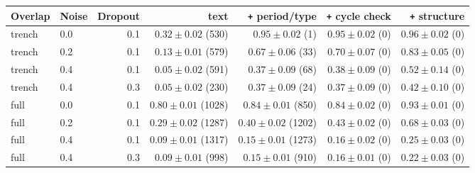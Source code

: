 \begin{tabular}{llrrrrr}
\toprule
Overlap & Noise & Dropout & text & \texttt{+} period/type & \texttt{+} cycle check & \texttt{+} structure \\
\midrule
trench & 0.0 & 0.1 & $0.32 \pm 0.02$ (530) & $0.95 \pm 0.02$ (1) & $0.95 \pm 0.02$ (0) & \textbf{$0.96 \pm 0.02$} (0) \\
trench & 0.2 & 0.1 & $0.13 \pm 0.01$ (579) & $0.67 \pm 0.06$ (33) & $0.70 \pm 0.07$ (0) & \textbf{$0.83 \pm 0.05$} (0) \\
trench & 0.4 & 0.1 & $0.05 \pm 0.02$ (591) & $0.37 \pm 0.09$ (68) & $0.38 \pm 0.09$ (0) & \textbf{$0.52 \pm 0.14$} (0) \\
trench & 0.4 & 0.3 & $0.05 \pm 0.02$ (230) & $0.37 \pm 0.09$ (24) & $0.37 \pm 0.09$ (0) & \textbf{$0.42 \pm 0.10$} (0) \\
full & 0.0 & 0.1 & $0.80 \pm 0.01$ (1028) & $0.84 \pm 0.01$ (850) & $0.84 \pm 0.02$ (0) & \textbf{$0.93 \pm 0.01$} (0) \\
full & 0.2 & 0.1 & $0.29 \pm 0.02$ (1287) & $0.40 \pm 0.02$ (1202) & $0.43 \pm 0.02$ (0) & \textbf{$0.68 \pm 0.03$} (0) \\
full & 0.4 & 0.1 & $0.09 \pm 0.01$ (1317) & $0.15 \pm 0.01$ (1273) & $0.16 \pm 0.02$ (0) & \textbf{$0.25 \pm 0.03$} (0) \\
full & 0.4 & 0.3 & $0.09 \pm 0.01$ (998) & $0.15 \pm 0.01$ (910) & $0.16 \pm 0.01$ (0) & \textbf{$0.22 \pm 0.03$} (0) \\
\bottomrule
\end{tabular}

